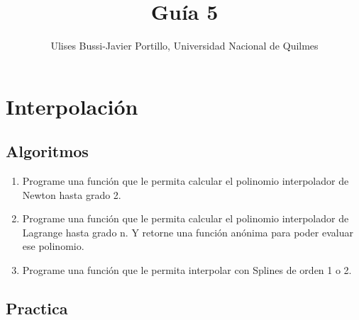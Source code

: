 \documentclass[a4paper,11pt]{article}
\makeatletter
\theoremstyle{mytheor}
\renewcommand{\maketitle}{
\colorbox{gray!20}{\framebox[\linewidth]{ \huge \textsc{\@title} } 
\lfoot{\@title}
}

}
\makeatother
\begin{document}
\title{Guía 5}

\author{Ulises Bussi-Javier Portillo, Universidad Nacional de Quilmes}


\maketitle \vspace{20pt}

\section*{Interpolación}


\subsection*{Algoritmos}

\begin{enumerate}[label=\Roman*]

\item Programe una función que le permita calcular el polinomio interpolador de Newton hasta grado 2.

\item Programe una función que le permita calcular el polinomio interpolador de Lagrange hasta grado n. Y retorne una función anónima para poder evaluar ese polinomio.

\item Programe una función que le permita interpolar con Splines de orden 1 o 2.

\end{enumerate}


\subsection*{Practica}
\end{document}
